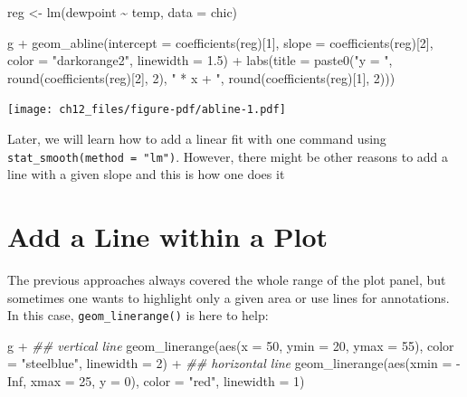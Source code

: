 \documentclass[
  letterpaper,
]{scrbook}
\newenvironment{Shaded}{\begin{snugshade}}{\end{snugshade}}
\newcommand{\AttributeTok}[1]{\textcolor[rgb]{0.40,0.45,0.13}{#1}}
\newcommand{\ConstantTok}[1]{\textcolor[rgb]{0.56,0.35,0.01}{#1}}
\newcommand{\DecValTok}[1]{\textcolor[rgb]{0.68,0.00,0.00}{#1}}
\newcommand{\DocumentationTok}[1]{\textcolor[rgb]{0.37,0.37,0.37}{\textit{#1}}}
\newcommand{\FloatTok}[1]{\textcolor[rgb]{0.68,0.00,0.00}{#1}}
\newcommand{\FunctionTok}[1]{\textcolor[rgb]{0.28,0.35,0.67}{#1}}
\newcommand{\NormalTok}[1]{\textcolor[rgb]{0.00,0.23,0.31}{#1}}
\newcommand{\OtherTok}[1]{\textcolor[rgb]{0.00,0.23,0.31}{#1}}
\newcommand{\SpecialCharTok}[1]{\textcolor[rgb]{0.37,0.37,0.37}{#1}}
\newcommand{\StringTok}[1]{\textcolor[rgb]{0.13,0.47,0.30}{#1}}
\begin{document}
\begin{Shaded}
\begin{Highlighting}[]
\NormalTok{reg }\OtherTok{\textless{}{-}} \FunctionTok{lm}\NormalTok{(dewpoint }\SpecialCharTok{\textasciitilde{}}\NormalTok{ temp, }\AttributeTok{data =}\NormalTok{ chic)}

\NormalTok{g }\SpecialCharTok{+}
  \FunctionTok{geom\_abline}\NormalTok{(}\AttributeTok{intercept =} \FunctionTok{coefficients}\NormalTok{(reg)[}\DecValTok{1}\NormalTok{],}
              \AttributeTok{slope =} \FunctionTok{coefficients}\NormalTok{(reg)[}\DecValTok{2}\NormalTok{],}
              \AttributeTok{color =} \StringTok{"darkorange2"}\NormalTok{, }
              \AttributeTok{linewidth =} \FloatTok{1.5}\NormalTok{) }\SpecialCharTok{+}
  \FunctionTok{labs}\NormalTok{(}\AttributeTok{title =} \FunctionTok{paste0}\NormalTok{(}\StringTok{"y = "}\NormalTok{, }\FunctionTok{round}\NormalTok{(}\FunctionTok{coefficients}\NormalTok{(reg)[}\DecValTok{2}\NormalTok{], }\DecValTok{2}\NormalTok{),}
                      \StringTok{" * x + "}\NormalTok{, }\FunctionTok{round}\NormalTok{(}\FunctionTok{coefficients}\NormalTok{(reg)[}\DecValTok{1}\NormalTok{], }\DecValTok{2}\NormalTok{)))}
\end{Highlighting}
\end{Shaded}

\texttt{[image: ch12\_files/figure-pdf/abline-1.pdf]}

Later, we will learn how to add a linear fit with one command using
\texttt{stat\_smooth(method\ =\ "lm")}. However, there might be other
reasons to add a line with a given slope and this is how one does it 🤷

\section{Add a Line within a Plot}\label{add-a-line-within-a-plot}

The previous approaches always covered the whole range of the plot
panel, but sometimes one wants to highlight only a given area or use
lines for annotations. In this case, \texttt{geom\_linerange()} is here
to help:

\begin{Shaded}
\begin{Highlighting}[]
\NormalTok{g }\SpecialCharTok{+}
  \DocumentationTok{\#\# vertical line}
  \FunctionTok{geom\_linerange}\NormalTok{(}\FunctionTok{aes}\NormalTok{(}\AttributeTok{x =} \DecValTok{50}\NormalTok{, }\AttributeTok{ymin =} \DecValTok{20}\NormalTok{, }\AttributeTok{ymax =} \DecValTok{55}\NormalTok{),}
                 \AttributeTok{color =} \StringTok{"steelblue"}\NormalTok{, }\AttributeTok{linewidth =} \DecValTok{2}\NormalTok{) }\SpecialCharTok{+}
  \DocumentationTok{\#\# horizontal line}
  \FunctionTok{geom\_linerange}\NormalTok{(}\FunctionTok{aes}\NormalTok{(}\AttributeTok{xmin =} \SpecialCharTok{{-}}\ConstantTok{Inf}\NormalTok{, }\AttributeTok{xmax =} \DecValTok{25}\NormalTok{, }\AttributeTok{y =} \DecValTok{0}\NormalTok{),}
                 \AttributeTok{color =} \StringTok{"red"}\NormalTok{, }\AttributeTok{linewidth =} \DecValTok{1}\NormalTok{)}
\end{Highlighting}
\end{Shaded}
\end{document}
